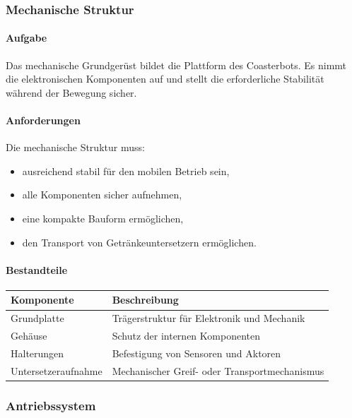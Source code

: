 \subsubsection{Mechanische Struktur}\label{mechanische-struktur}

\paragraph{Aufgabe}\label{aufgabe}

Das mechanische Grundgerüst bildet die Plattform des Coasterbots. Es
nimmt die elektronischen Komponenten auf und stellt die erforderliche
Stabilität während der Bewegung sicher.

\paragraph{Anforderungen}\label{anforderungen}

Die mechanische Struktur muss:

\begin{itemize}
\tightlist
\item
  ausreichend stabil für den mobilen Betrieb sein,
\item
  alle Komponenten sicher aufnehmen,
\item
  eine kompakte Bauform ermöglichen,
\item
  den Transport von Getränkeuntersetzern ermöglichen.
\end{itemize}

\paragraph{Bestandteile}\label{bestandteile}

\begin{longtable}[]{@{}ll@{}}
\toprule\noalign{}
Komponente & Beschreibung \\
\midrule\noalign{}
\endhead
\bottomrule\noalign{}
\endlastfoot
Grundplatte & Trägerstruktur für Elektronik und Mechanik \\
Gehäuse & Schutz der internen Komponenten \\
Halterungen & Befestigung von Sensoren und Aktoren \\
Untersetzeraufnahme & Mechanischer Greif- oder Transportmechanismus \\
\end{longtable}

\subsubsection{Antriebssystem}\label{antriebssystem}

